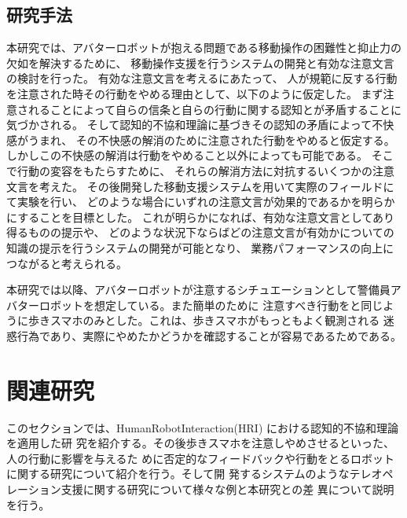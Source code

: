 \documentclass{kuisthesis}
\begin{document}
\subsection{研究手法}
\label{sec: 研究目的}
本研究では、アバターロボットが抱える問題である移動操作の困難性と抑止力の欠如を解決するために、
移動操作支援を行うシステムの開発と有効な注意文言の検討を行った。
有効な注意文言を考えるにあたって、
人が規範に反する行動を注意された時その行動をやめる理由として、以下のように仮定した。
まず注意されることによって自らの信条と自らの行動に関する認知とが矛盾することに気づかされる。
そして認知的不協和理論\cite{Festinger1957}に基づきその認知の矛盾によって不快感がうまれ、
その不快感の解消のために注意された行動をやめると仮定する。
しかしこの不快感の解消は行動をやめること以外によっても可能である。
そこで行動の変容をもたらすために、
それらの解消方法に対抗するいくつかの注意文言を考えた。
その後開発した移動支援システムを用いて実際のフィールドにて実験を行い、
どのような場合にいずれの注意文言が効果的であるかを明らかにすることを目標とした。
これが明らかになれば、有効な注意文言としてあり得るものの提示や、
どのような状況下ならばどの注意文言が有効かについての知識の提示を行うシステムの開発が可能となり、
業務パフォーマンスの向上につながると考えられる。


本研究では以降、アバターロボットが注意するシチュエーションとして警備員アバターロボットを想定している。また簡単のために
注意すべき行動を\cite{Schneider2022,Mizumaru2019}と同じように歩きスマホのみとした。これは、歩きスマホがもっともよく観測される
迷惑行為であり、実際にやめたかどうかを確認することが容易であるためである。



\section{関連研究}
このセクションでは、HumanRobotInteraction(HRI) における認知的不協和理論を適用した研
究を紹介する。その後歩きスマホを注意しやめさせるといった、人の行動に影響を与えるた
めに否定的なフィードバックや行動をとるロボットに関する研究について紹介を行う。そして開
発するシステムのようなテレオペレーション支援に関する研究について様々な例と本研究との差
異について説明を行う。
\end{document}

